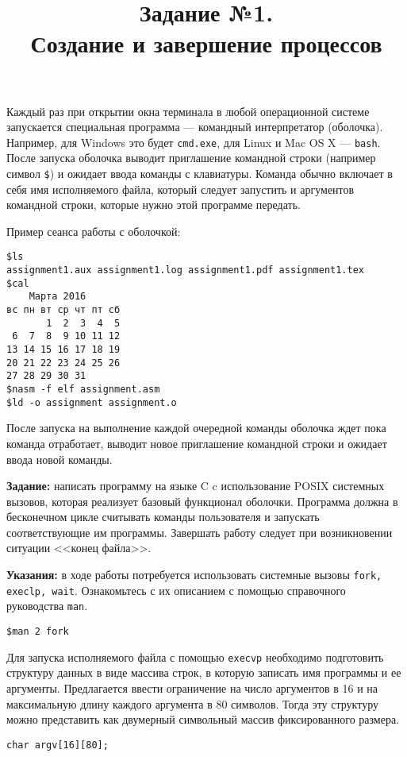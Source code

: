 \documentclass{extarticle}
\title{Задание №1. \\ Создание и завершение процессов}
\begin{document}
\maketitle

Каждый раз при открытии окна терминала в любой операционной системе запускается специальная программа --- командный интерпретатор (оболочка). Например, для Windows это будет {\tt cmd.exe}, для Linux и Mac OS X --- {\tt bash}. После запуска оболочка выводит приглашение командной строки (например символ {\tt \$}) и ожидает ввода команды с клавиатуры. Команда обычно включает в себя имя исполняемого файла, который следует запустить и аргументов командной строки, которые нужно этой программе передать. 

Пример сеанса работы с оболочкой:
\begin{verbatim}
$ls
assignment1.aux assignment1.log assignment1.pdf assignment1.tex
$cal
    Марта 2016
вс пн вт ср чт пт сб
       1  2  3  4  5
 6  7  8  9 10 11 12
13 14 15 16 17 18 19
20 21 22 23 24 25 26
27 28 29 30 31
$nasm -f elf assignment.asm
$ld -o assignment assignment.o
\end{verbatim}

После запуска на выполнение каждой очередной команды оболочка ждет пока 
команда отработает, выводит новое приглашение командной строки и ожидает 
ввода новой команды.

{\bf Задание:} написать программу на языке C\cite{KnR} c использование POSIX\cite{Stolyarov} системных вызовов, которая реализует базовый функционал оболочки. Программа должна в бесконечном цикле считывать команды пользователя и запускать соответствующие им программы. Завершать работу следует при возникновении ситуации <<конец файла>>.

{\bf Указания:} в ходе работы потребуется использовать системные вызовы {\tt fork, execlp, wait}. Ознакомьтесь с их описанием с помощью справочного руководства {\tt man}.
\begin{verbatim}
$man 2 fork
\end{verbatim}

Для запуска исполняемого файла с помощью {\tt execvp} необходимо подготовить 
структуру данных в виде массива строк, в которую записать имя программы и ее аргументы. Предлагается ввести ограничение на число аргументов в 16 и на максимальную длину каждого аргумента в 80 символов. Тогда эту структуру 
можно представить как двумерный символьный массив фиксированного размера.
\begin{verbatim}
char argv[16][80];
\end{verbatim}
\end{document}

